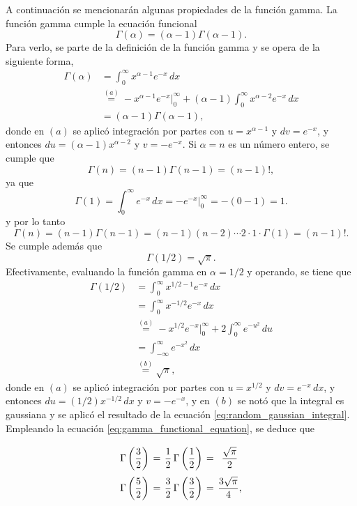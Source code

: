 \documentclass[a4paper]{report}
\begin{document}
A continuación se mencionarán algunas propiedades de la función gamma. La función gamma cumple la ecuación funcional
\begin{equation}\label{eq:gamma_functional_equation}
 \Gamma(\alpha)=(\alpha-1)\Gamma(\alpha-1).
\end{equation}
Para verlo, se parte de la definición de la función gamma y se opera de la siguiente forma, 
\begin{align*}
 \Gamma(\alpha)&=\int_{0}^{\infty}x^{\alpha-1}e^{-x}\,dx\\
   &\overset{(a)}{=}-x^{\alpha-1}e^{-x}\Big|_{0}^{\infty}+(\alpha-1)\int_{0}^{\infty}x^{\alpha-2}e^{-x}\,dx\\
   &=(\alpha-1)\Gamma(\alpha-1),
\end{align*}
donde en \((a)\) se aplicó integración por partes con \(u=x^{\alpha-1}\) y \(dv=e^{-x}\), y entonces \(du=(\alpha-1)x^{\alpha-2}\) y \(v=-e^{-x}\).
Si \(\alpha=n\) es un número entero, se cumple que
\begin{equation}\label{eq:gamma_function_equals_factorial}
 \Gamma(n)=(n-1)\Gamma(n-1)=(n-1)!,
\end{equation}
ya que
\[
 \Gamma(1)=\int_{0}^{\infty}e^{-x}\,dx=-e^{-x}\Big|_{0}^{\infty}=-(0-1)=1.
\]
y por lo tanto
\[
 \Gamma(n)=(n-1)\Gamma(n-1)=(n-1)(n-2)\cdots 2\cdot 1\cdot\Gamma(1)=(n-1)!.
\]
Se cumple además que
\[
 \Gamma(1/2)=\sqrt{\pi}.
\]
Efectivamente, evaluando la función gamma en \(\alpha=1/2\) y operando, se tiene que 
\begin{align*}
 \Gamma(1/2)&=\int_{0}^{\infty}x^{1/2-1}e^{-x}\,dx\\
   &=\int_{0}^{\infty}x^{-1/2}e^{-x}\,dx\\
   &\overset{(a)}{=}-x^{1/2}e^{-x}\Big|_{0}^{\infty}+2\int_{0}^{\infty}e^{-u^2}\,du\\
   &=\int_{-\infty}^{\infty}e^{-x^2}\,dx\\
   &\overset{(b)}{=}\sqrt{\pi},
\end{align*}
donde en \((a)\) se aplicó integración por partes con \(u=x^{1/2}\) y \(dv=e^{-x}\,dx\), y entonces \(du=(1/2)x^{-1/2}\,dx\) y \(v=-e^{-x}\), y en \((b)\) se notó que la integral es gaussiana y se aplicó el resultado de la ecuación \ref{eq:random_gaussian_integral}.
Empleando la ecuación \ref{eq:gamma_functional_equation}, se deduce que
\[\arraycolsep=2pt\def\arraystretch{2.5}
\begin{array}{ccccc}
  \Gamma\left(\dfrac{3}{2}\right)&=&\dfrac{1}{2}\,\Gamma\left(\dfrac{1}{2}\right)&=&\dfrac{\sqrt{\pi}}{2}\\
  \Gamma\left(\dfrac{5}{2}\right)&=&\dfrac{3}{2}\,\Gamma\left(\dfrac{3}{2}\right)&=&\dfrac{3\sqrt{\pi}}{4},
\end{array}
\]
\end{document}
